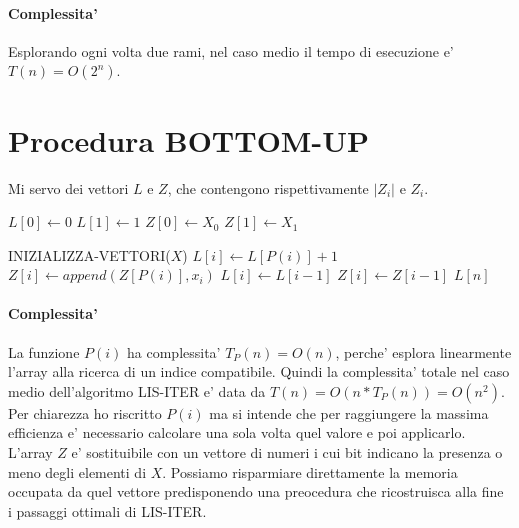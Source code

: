 \paragraph{Complessita'}

Esplorando ogni volta due rami, nel caso medio il tempo di esecuzione e' $T(n) = O(2^n)$.

\newpage

\section{Procedura BOTTOM-UP}

Mi servo dei vettori $L$ e $Z$, che contengono rispettivamente $|Z_i|$ e $Z_i$.

\begin{algorithm}
    \begin{algorithmic}
            \State $L[0] \gets 0$
            \State $L[1] \gets 1$
            \State $Z[0] \gets X_0$
            \State $Z[1] \gets X_1$
        \EndProcedure
    \end{algorithmic}
\end{algorithm}

\begin{algorithm}
    \begin{algorithmic}
            \State INIZIALIZZA-VETTORI($X$)
                    \State $L[i] \gets L[P(i)] + 1$
                    \State $Z[i] \gets append(Z[P(i)], x_i)$
                \Else
                    \State $L[i] \gets L[i-1]$
                    \State $Z[i] \gets Z[i-1]$
                \EndIf
            \EndFor
            \State \Return $L[n]$
        \EndProcedure
    \end{algorithmic}
\end{algorithm}

\paragraph{Complessita'}

La funzione $P(i)$ ha complessita' $T_P(n) = O(n)$, perche' esplora linearmente l'array alla ricerca di un indice compatibile.
Quindi la complessita' totale nel caso medio dell'algoritmo LIS-ITER e' data da $T(n) = O(n * T_P(n)) = O(n^2)$. \\

Per chiarezza ho riscritto $P(i)$ ma si intende che per raggiungere la massima efficienza e' necessario calcolare una sola volta quel valore e poi applicarlo. \\ 

L'array $Z$ e' sostituibile con un vettore di numeri i cui bit indicano la presenza o meno degli elementi di $X$.
Possiamo risparmiare direttamente la memoria occupata da quel vettore predisponendo una preocedura che ricostruisca alla fine i passaggi ottimali di LIS-ITER.